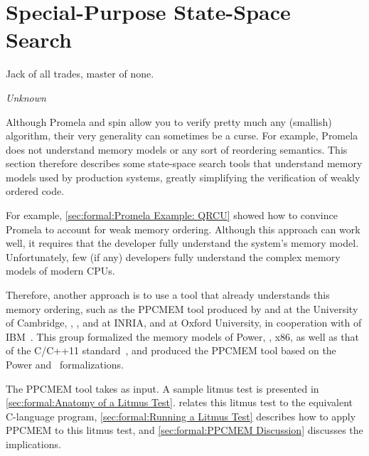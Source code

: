 
\section{Special-Purpose State-Space Search}
\label{sec:formal:Special-Purpose State-Space Search}
%
\epigraph{Jack of all trades, master of none.}{\emph{Unknown}}

Although Promela and spin allow you to verify pretty much any (smallish)
algorithm, their very generality can sometimes be a curse.
For example, Promela does not understand memory models or any sort
of reordering semantics.
This section therefore describes some state-space search tools that
understand memory models used by production systems, greatly simplifying the
verification of weakly ordered code.

For example,
\cref{sec:formal:Promela Example: QRCU}
showed how to convince Promela to account for weak memory ordering.
Although this approach can work well, it requires that the developer
fully understand the system's memory model.
Unfortunately, few (if any) developers fully understand the complex
memory models of modern CPUs.

Therefore, another approach is to use a tool that already understands
this memory ordering, such as the PPCMEM tool produced by
 and  at the University of Cambridge,
, , and
 at INRIA, and  at Oxford University,
in cooperation with  of
IBM~\cite{JadeAlglave2011ppcmem}.
This group formalized the memory models of Power, \ARM, x86, as well
as that of the C/C++11 standard~\cite{RichardSmith2019N4800}, and
produced the PPCMEM tool based on the Power and \ARM\ formalizations.

\QuickQuizEnd

The PPCMEM tool takes \emph{} as input.
A sample litmus test is presented in
\cref{sec:formal:Anatomy of a Litmus Test}.
relates this litmus test to the equivalent C-language program,
\cref{sec:formal:Running a Litmus Test} describes how to
apply PPCMEM to this litmus test, and
\cref{sec:formal:PPCMEM Discussion}
discusses the implications.

